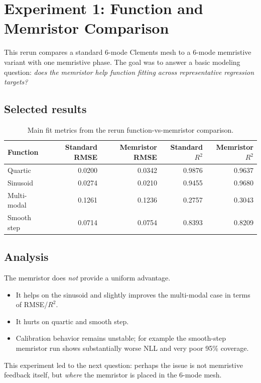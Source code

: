 \documentclass[11pt,a4paper]{article}
\begin{document}
\section{Experiment 1: Function and Memristor Comparison}

This rerun compares a standard 6-mode Clements mesh to a 6-mode memristive variant with one memristive phase. The goal was to answer a basic modeling question: \emph{does the memristor help function fitting across representative regression targets?}

\subsection{Selected results}

\begin{table}[H]
\centering
\begin{tabular}{lrrrr}
\toprule
Function & Standard RMSE & Memristor RMSE & Standard $R^2$ & Memristor $R^2$ \\
\midrule
Quartic & 0.0200 & 0.0342 & 0.9876 & 0.9637 \\
Sinusoid & 0.0274 & 0.0210 & 0.9455 & 0.9680 \\
Multi-modal & 0.1261 & 0.1236 & 0.2757 & 0.3043 \\
Smooth step & 0.0714 & 0.0754 & 0.8393 & 0.8209 \\
\bottomrule
\end{tabular}
\caption{Main fit metrics from the rerun function-vs-memristor comparison.}
\end{table}

\subsection{Analysis}
The memristor does \emph{not} provide a uniform advantage.
\begin{itemize}[leftmargin=*]
    \item It helps on the sinusoid and slightly improves the multi-modal case in terms of RMSE/$R^2$.
    \item It hurts on quartic and smooth step.
    \item Calibration behavior remains unstable; for example the smooth-step memristor run shows substantially worse NLL and very poor 95\% coverage.
\end{itemize}

This experiment led to the next question: perhaps the issue is not memristive feedback itself, but \emph{where} the memristor is placed in the 6-mode mesh.
\end{document}
